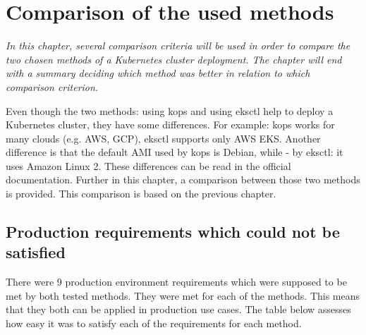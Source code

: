 \section{Comparison of the used methods}
\textit{In this chapter, several comparison criteria will be used in order to compare the two chosen methods of a Kubernetes cluster deployment. The chapter will end with a summary deciding which method was better in relation to which comparison criterion.}

Even though the two methods: using kops and using eksctl help to deploy a Kubernetes cluster, they have some differences. For example: kops works for many clouds (e.g. AWS, GCP), eksctl supports only AWS EKS. Another difference is that the default AMI used by kops is Debian, while - by eksctl: it uses Amazon Linux 2. These differences can be read in the official documentation. Further in this chapter, a comparison between those two methods is provided. This comparison is based on the previous chapter.

\subsection{Production requirements which could not be satisfied}

There were 9 production environment requirements which were supposed to be met by both tested methods. They were met for each of the methods. This means that they both can be applied in production use cases. The table below assesses how easy it was to satisfy each of the requirements for each method.

